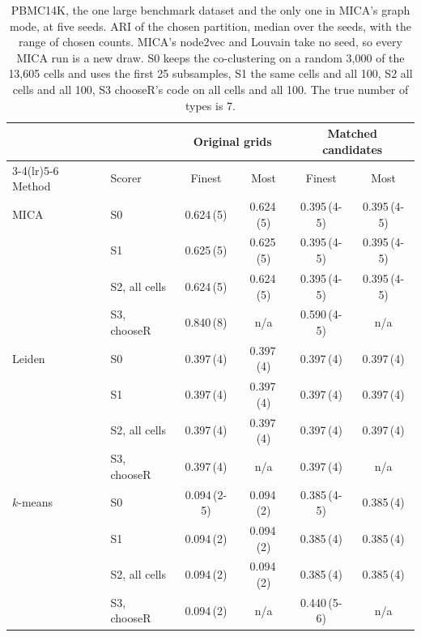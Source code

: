 \begin{table}[t]
\centering
\caption{PBMC14K, the one large benchmark dataset and the only one in MICA's graph mode, at five seeds. ARI of the chosen partition, median over the seeds, with the range of chosen counts. MICA's node2vec and Louvain take no seed, so every MICA run is a new draw. S0 keeps the co-clustering on a random 3,000 of the 13,605 cells and uses the first 25 subsamples, S1 the same cells and all 100, S2 all cells and all 100, S3 chooseR's code on all cells and all 100. The true number of types is 7.}
\label{tab:pbmc}
\footnotesize
\setlength{\tabcolsep}{4pt}
\begin{tabular}{llcccc}
\toprule
 & & \multicolumn{2}{c}{Original grids} & \multicolumn{2}{c}{Matched candidates} \\
\cmidrule(lr){3-4}\cmidrule(lr){5-6}
Method & Scorer & Finest & Most & Finest & Most \\
\midrule
MICA & S0 & 0.624\,(5) & 0.624\,(5) & 0.395\,(4\textrm{-}5) & 0.395\,(4\textrm{-}5) \\
 & S1 & 0.625\,(5) & 0.625\,(5) & 0.395\,(4\textrm{-}5) & 0.395\,(4\textrm{-}5) \\
 & S2, all cells & 0.624\,(5) & 0.624\,(5) & 0.395\,(4\textrm{-}5) & 0.395\,(4\textrm{-}5) \\
 & S3, chooseR & 0.840\,(8) & n/a & 0.590\,(4\textrm{-}5) & n/a \\
\midrule
Leiden & S0 & 0.397\,(4) & 0.397\,(4) & 0.397\,(4) & 0.397\,(4) \\
 & S1 & 0.397\,(4) & 0.397\,(4) & 0.397\,(4) & 0.397\,(4) \\
 & S2, all cells & 0.397\,(4) & 0.397\,(4) & 0.397\,(4) & 0.397\,(4) \\
 & S3, chooseR & 0.397\,(4) & n/a & 0.397\,(4) & n/a \\
\midrule
$k$-means & S0 & 0.094\,(2\textrm{-}5) & 0.094\,(2) & 0.385\,(4\textrm{-}5) & 0.385\,(4) \\
 & S1 & 0.094\,(2) & 0.094\,(2) & 0.385\,(4) & 0.385\,(4) \\
 & S2, all cells & 0.094\,(2) & 0.094\,(2) & 0.385\,(4) & 0.385\,(4) \\
 & S3, chooseR & 0.094\,(2) & n/a & 0.440\,(5\textrm{-}6) & n/a \\
\bottomrule
\end{tabular}
\end{table}
